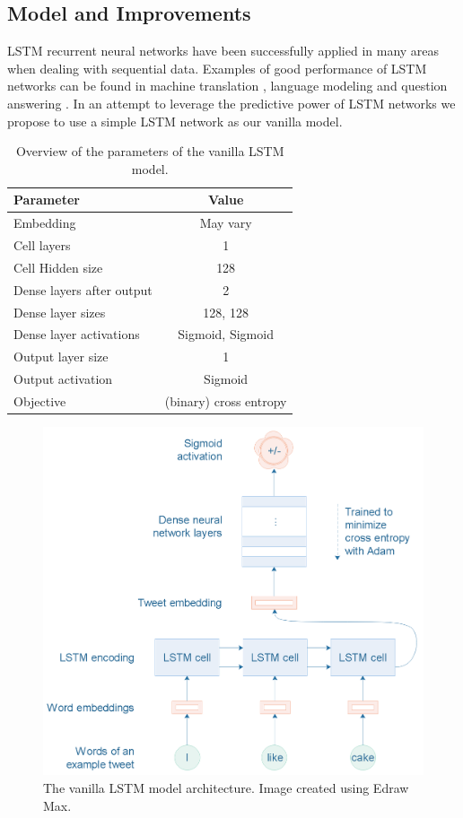 \documentclass[conference]{IEEEtran}
\begin{document}
\subsection{Model and Improvements}
LSTM recurrent neural networks \cite{LSTM, LSTM_PLUS} have been successfully applied in many areas when dealing with sequential data. Examples of good performance of LSTM networks can be found in machine translation \cite{Machine_translation}, language modeling \cite{language_modeling} and question answering \cite{question_answering}. In an attempt to leverage the predictive power of LSTM networks we propose to use a simple LSTM network as our vanilla model.
\begin{table}[h!]
\centering
\begin{tabular}{l|c}
Parameter & Value \\
\hline
Embedding & May vary\\
Cell layers & 1 \\
Cell Hidden size & 128 \\
Dense layers after output & 2 \\
Dense layer sizes & 128, 128 \\
Dense layer activations & Sigmoid, Sigmoid\\
Output layer size & 1\\
Output activation & Sigmoid\\
Objective & (binary) cross entropy\\
\end{tabular}
\caption{Overview of the parameters of the vanilla LSTM model.}
\label{tab:vanilla_params}
\end{table}
    \begin{figure}
    \centering
    \includegraphics[scale=0.5]{fig/LSTM.PNG}
    \caption{The vanilla LSTM model architecture. Image created using Edraw Max\cite{Edraw}.}
    \label{fig:vanilla}
    \end{figure}\\
\end{document}
